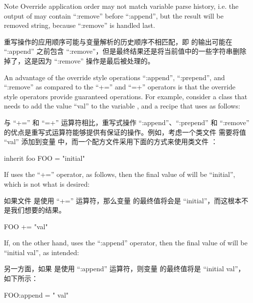 \begin{noteblock}{Note}%
Override application order may not match variable parse history, i.e. the output of  may contain ``:remove'' before ``:append'', but the result will be removed string, because ``:remove'' is handled last.

\medskip
重写操作的应用顺序可能与变量解析的历史顺序不相匹配，即  的输出可能在 ``:append'' 之前包含 ``:remove''，但是最终结果还是将当前值中的一些字符串删除掉了，这是因为 ``:remove'' 操作是最后被处理的。
\end{noteblock}


An advantage of the override style operations ``:append'', ``:prepend'', and ``:remove'' as compared to the ``+='' and ``=+'' operators is that the override style operators provide guaranteed operations. For example, consider a class    that needs to add the value ``val'' to the variable , and a recipe that uses    as follows:

与 ``+='' 和 ``=+'' 运算符相比，重写式操作 ``:append''、``:prepend'' 和 ``:remove'' 的优点是重写式运算符能够提供有保证的操作。例如，考虑一个类文件  需要将值 ``val'' 添加到变量  中，而一个配方文件采用下面的方式来使用类文件 ：

\begin{pyglist}
inherit foo
FOO = "initial"
\end{pyglist}

If    uses the ``+='' operator, as follows, then the final value of  will be ``initial'', which is not what is desired:

如果文件  是使用 ``+='' 运算符，那么变量  的最终值将会是 ``initial''，而这根本不是我们想要的结果。

\begin{pyglist}
FOO += "val"
\end{pyglist}

If, on the other hand,    uses the ``:append'' operator, then the final value of  will be ``initial val'', as intended:

另一方面，如果  是使用 ``:append'' 运算符，则变量  的最终值将是 ``initial val''，如下所示：

\begin{pyglist}
FOO:append = " val"
\end{pyglist}


